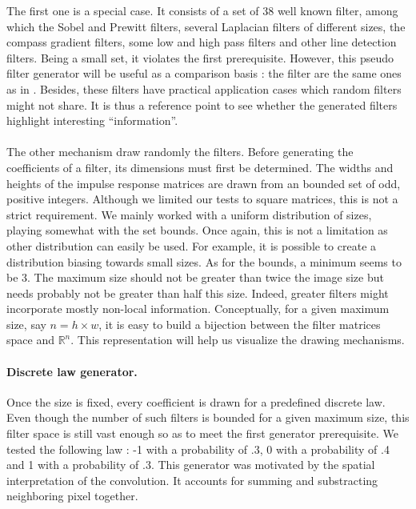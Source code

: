 \documentclass[a4paper]{report}
\begin{document}
			The first one is a special case. It consists of a set of 38 well known filter, among which the Sobel and Prewitt filters, several Laplacian filters of different sizes, the compass gradient filters, some low and high pass filters and other line detection filters.
			Being a small set, it violates the first prerequisite. However, this pseudo filter generator will be useful as a comparison basis : the filter are the same ones as in \cite{}. Besides, these filters have practical application cases which random filters might not share. It is thus a reference point to see whether the generated filters highlight interesting ``information''.
			\paragraph{}
			The other mechanism draw randomly the filters. Before generating the coefficients of a filter, its dimensions must first be determined. The widths and heights of the impulse response matrices are drawn from an bounded set of odd, positive integers. Although we limited our tests to square matrices, this is not a strict requirement.
			We mainly worked with a uniform distribution of sizes, playing somewhat with the set bounds. Once again, this is not a limitation as other distribution can easily be used. For example, it is possible to create a distribution biasing towards small sizes. 
			As for the bounds, a minimum seems to be 3. The maximum size should not be greater than twice the image size but needs probably not be greater than half this size. Indeed, greater filters might incorporate mostly non-local information.
			Conceptually, for a given maximum size, say $n = h \times w$, it is easy to build a bijection between the filter matrices space and $\mathbb{R}^n$. This representation will help us visualize the drawing mechanisms.
			\paragraph{Discrete law generator.}
			Once the size is fixed, every coefficient is drawn for a predefined discrete law. Even though the number of such filters is bounded for a given maximum size, this filter space is still vast enough so as to meet the first generator prerequisite. We tested the following law : -1 with a probability of .3, 0 with a probability of .4 and 1 with a probability of .3.
			This generator was motivated by the spatial interpretation of the convolution. It accounts for summing and substracting neighboring pixel together.
\end{document}
